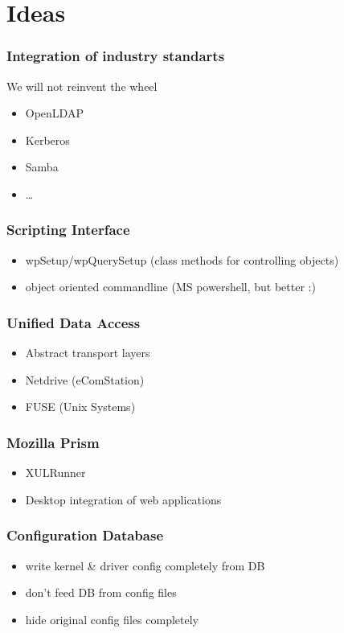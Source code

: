 \documentclass{beamer}
\begin{document}
\section{Ideas}

\begin{frame}
\frametitle{Integration of industry standarts}
We will not reinvent the wheel
\begin{itemize}
  \item OpenLDAP
  \item Kerberos
  \item Samba
  \item \ldots
\end{itemize}
\end{frame}

\begin{frame}
\frametitle{Scripting Interface}
\begin{itemize}
  \item wpSetup/wpQuerySetup (class methods for controlling objects)
  \item object oriented commandline (MS powershell, but better :)  
\end{itemize}
\end{frame}

\begin{frame}
\frametitle{Unified Data Access}
\begin{itemize}
  \item Abstract transport layers
  \item Netdrive (eComStation)
  \item FUSE (Unix Systems)
\end{itemize}
\end{frame}

\begin{frame}
\frametitle{Mozilla Prism}
\begin{itemize}
  \item XULRunner
  \item Desktop integration of web applications
\end{itemize}
\end{frame}

\begin{frame}
\frametitle{Configuration Database}
\begin{itemize}
  \item write kernel \& driver config completely from DB
  \item don't feed DB from config files
  \item hide original config files completely   
\end{itemize}
\end{frame}
\end{document}
